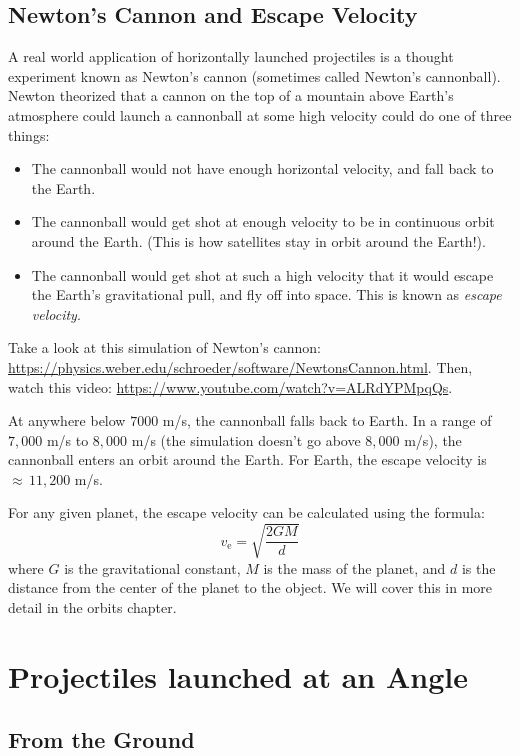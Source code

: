 \subsection{Newton's Cannon and Escape Velocity}
A real world application of horizontally launched projectiles is a thought experiment known as Newton's cannon (sometimes called Newton's cannonball). Newton theorized that a cannon on the top of a mountain above Earth's atmosphere could launch a cannonball at some high velocity could do one of three things:
\begin{itemize}
    \item The cannonball would not have enough horizontal velocity, and fall back to the Earth. 
    \item The cannonball would get shot at enough velocity to be in continuous orbit around the Earth. (This is how satellites stay in orbit around the Earth!).
    \item The cannonball would get shot at such a high velocity that it would escape the Earth's gravitational pull, and fly off into space. This is known as \emph{escape velocity}. 
\end{itemize}

Take a look at this simulation of Newton's cannon: \url{https://physics.weber.edu/schroeder/software/NewtonsCannon.html}. Then, watch this video: \url{https://www.youtube.com/watch?v=ALRdYPMpqQs}.

At anywhere below $7000$ m/s, the cannonball falls back to Earth. In a range of $7,000$ m/s to $8,000$ m/s (the simulation doesn't go above $8,000$ m/s), the cannonball enters an orbit around the Earth. For Earth, the escape velocity is $\approx \,11,200$ m/s.

For any given planet, the escape velocity can be calculated using the formula:
$${\displaystyle v_{\text{e}}={\sqrt {\frac {2GM}{d}}}}$$
where $G$ is the gravitational constant, $M$ is the mass of the planet, and $d$ is the distance from the center of the planet to the object. We will cover this in more detail in the orbits chapter.
\section{Projectiles launched at an Angle}
\subsection{From the Ground}

